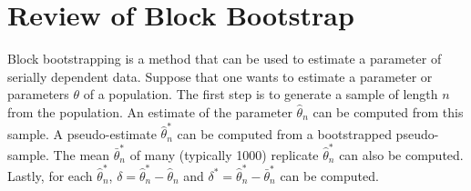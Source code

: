 \documentclass[12pt, letterpaper, titlepage]{article}
\begin{document}


\section{Review of Block Bootstrap}
\label{sec:blkbootreview}

Block bootstrapping is a method that can be used to estimate a parameter of serially dependent data. Suppose that one wants to estimate a parameter or parameters $\theta$ of a population. The first step is to generate a sample of length $n$ from the population. An estimate of the parameter $\hat{\theta}_{n}$ can be computed from this sample. A pseudo-estimate $\hat\theta_n^*$ can be computed from a bootstrapped pseudo-sample. The mean $\bar\theta_n^*$ of many (typically 1000) replicate $\hat\theta_n^*$ can also be computed. Lastly, for each $\hat\theta_n^*$, $\delta = \hat\theta_n^* - \hat{\theta}_{n}$ and $\delta^* = \hat\theta_n^* - \bar\theta_n^*$ can be computed.
\end{document}
